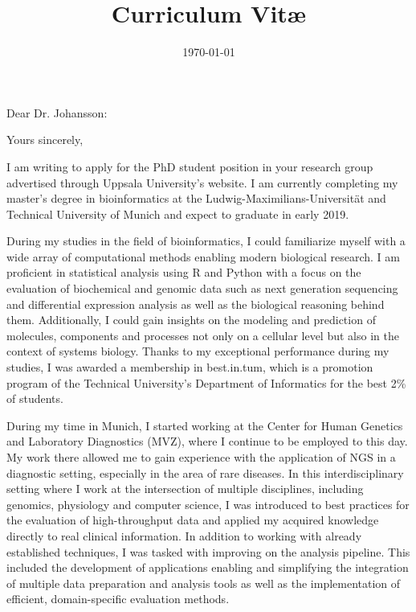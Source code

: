 \documentclass[11pt,a4paper,sans]{moderncv} %
\title{Curriculum Vit\ae{}}
\newcommand{\showletter}{}
\begin{document}
	
	
	\ifdefined\showletter
	\clearpage
	\vspace*{-2cm}
	\date{\today} %
	\opening{Dear Dr. Johansson:} %
	\closing{Yours sincerely,} %
	
	\makelettertitle %
	\justify
	\thispagestyle{empty}
	\enlargethispage{45pt}
	\vspace{-20pt}
	I am writing to apply for the PhD student position in your research group advertised through Uppsala University's website.
	I am currently completing my master's degree in bioinformatics at the Ludwig-Maximilians-Universität and Technical University of Munich and expect to graduate in early 2019.
	
	During my studies in the field of bioinformatics, I could familiarize myself with a wide array of computational methods enabling modern biological research.
	I am proficient in statistical analysis using R and Python with a focus on the evaluation of biochemical and genomic data such as next generation sequencing and differential expression analysis as well as the biological reasoning behind them.
	Additionally, I could gain insights on the modeling and prediction of molecules, components and processes not only on a cellular level but also in the context of systems biology.
	Thanks to my exceptional performance during my studies, I was awarded a membership in best.in.tum, which is a promotion program of the Technical University's Department of Informatics for the best 2\% of students.
	
	During my time in Munich, I started working at the Center for Human Genetics and Laboratory Diagnostics (MVZ), where I continue to be employed to this day.
	My work there allowed me to gain experience with the application of NGS in a diagnostic setting, especially in the area of rare diseases.
	In this interdisciplinary setting where I work at the intersection of multiple disciplines, including genomics, physiology and computer science, I was introduced to best practices for the evaluation of high-throughput data and applied my acquired knowledge directly to real clinical information.
	In addition to working with already established techniques, I was tasked with improving on the analysis pipeline.
	This included the development of applications enabling and simplifying the integration of multiple data preparation and analysis tools as well as the implementation of efficient, domain-specific evaluation methods.
	
\end{document}
